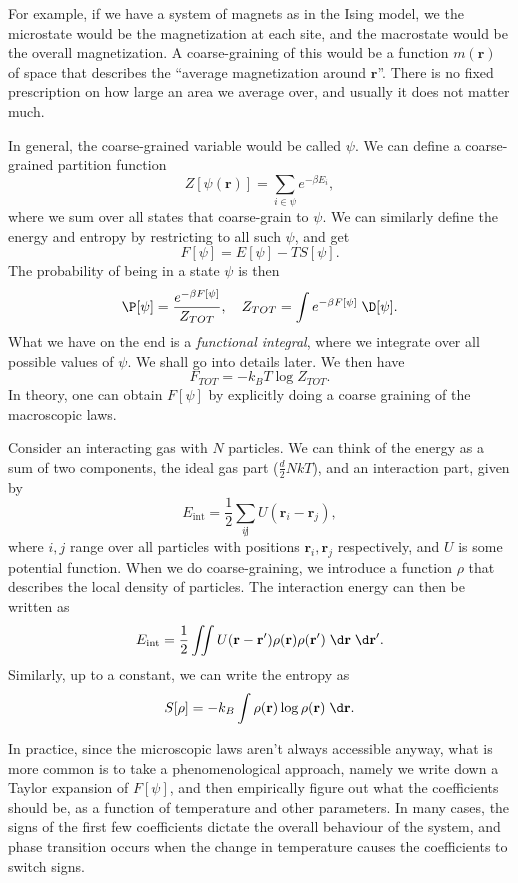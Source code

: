 \documentclass[a4paper]{article}
\begin{document}
For example, if we have a system of magnets as in the Ising model, we the microstate would be the magnetization at each site, and the macrostate would be the overall magnetization. A coarse-graining of this would be a function $m(\mathbf{r})$ of space that describes the ``average magnetization around $\mathbf{r}$''. There is no fixed prescription on how large an area we average over, and usually it does not matter much.

In general, the coarse-grained variable would be called $\psi$. We can define a coarse-grained partition function
\[
  Z[\psi(\mathbf{r})] = \sum_{i \in \psi} e^{-\beta E_i},
\]
where we sum over all states that coarse-grain to $\psi$. We can similarly define the energy and entropy by restricting to all such $\psi$, and get
\[
  F[\psi] = E[\psi] - T S[\psi].
\]
The probability of being in a state $\psi$ is then
\[
  \P[\psi] = \frac{e^{-\beta F[\psi]}}{Z_{TOT}},\quad Z_{TOT} = \int e^{-\beta F[\psi]} \;\D [\psi].
\]
What we have on the end is a \emph{functional integral}, where we integrate over all possible values of $\psi$. We shall go into details later. We then have
\[
  F_{TOT} = -k_B T \log Z_{TOT}.
\]
In theory, one can obtain $F[\psi]$ by explicitly doing a coarse graining of the macroscopic laws.

\begin{eg}
  Consider an interacting gas with $N$ particles. We can think of the energy as a sum of two components, the ideal gas part ($\frac{d}{2}NkT$), and an interaction part, given by
  \[
    E_{\mathrm{int}} = \frac{1}{2}\sum_{i \not j} U(\mathbf{r}_i - \mathbf{r}_j),
  \]
  where $i, j$ range over all particles with positions $\mathbf{r}_i, \mathbf{r}_j$ respectively, and $U$ is some potential function. When we do coarse-graining, we introduce a function $\rho$ that describes the local density of particles. The interaction energy can then be written as
  \[
    E_{\mathrm{int}} = \frac{1}{2} \iint U(\mathbf{r} - \mathbf{r}') \rho(\mathbf{r}) \rho(\mathbf{r}') \;\d \mathbf{r} \;\d \mathbf{r}'.
  \]
  Similarly, up to a constant, we can write the entropy as
  \[
    S[\rho] = -k_B \int \rho(\mathbf{r}) \log \rho(\mathbf{r}) \;\d \mathbf{r}.
  \]
\end{eg}

In practice, since the microscopic laws aren't always accessible anyway, what is more common is to take a phenomenological approach, namely we write down a Taylor expansion of $F[\psi]$, and then empirically figure out what the coefficients should be, as a function of temperature and other parameters. In many cases, the signs of the first few coefficients dictate the overall behaviour of the system, and phase transition occurs when the change in temperature causes the coefficients to switch signs.
\end{document}
